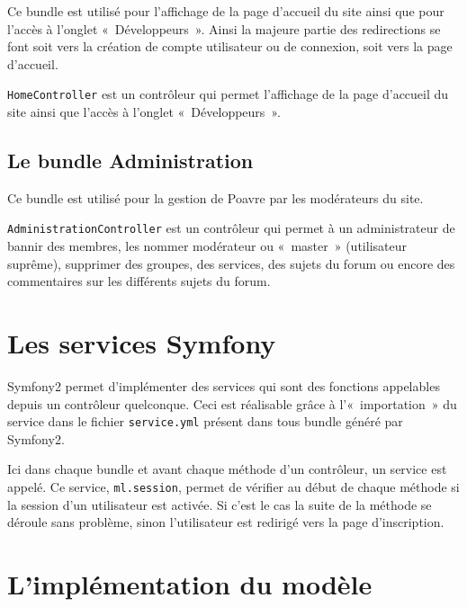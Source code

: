 
Ce bundle est utilisé pour l'affichage de la page d'accueil du site ainsi que pour l'accès à l'onglet «~Développeurs~».
Ainsi la majeure partie des redirections se font soit vers la création de compte utilisateur ou de connexion, soit vers la page d'accueil.

\verb|HomeController| est un contrôleur qui permet l'affichage de la page d'accueil du site ainsi que l'accès à l'onglet «~Développeurs~».

\subsection{Le bundle Administration}


Ce bundle est utilisé pour la gestion de Poavre par les modérateurs du site.

\verb|AdministrationController| est un contrôleur qui permet à un administrateur de bannir des membres, les nommer modérateur ou «~master~» (utilisateur suprême), supprimer des groupes, des services, des sujets du forum ou encore des commentaires sur les différents sujets du forum.


\section{Les services Symfony}

Symfony2 permet d'implémenter des services qui sont des fonctions appelables depuis un contrôleur quelconque. Ceci est réalisable grâce à l'«~importation~» du service dans le fichier \verb|service.yml| présent dans tous bundle généré par Symfony2.

Ici dans chaque bundle et avant chaque méthode d'un contrôleur, un service est appelé. Ce service, \verb|ml.session|, permet de vérifier au début de chaque méthode si la session d'un utilisateur est activée. Si c'est le cas la suite de la méthode se déroule sans problème, sinon l'utilisateur est redirigé vers la page d'inscription.

\section{L'implémentation du modèle}


